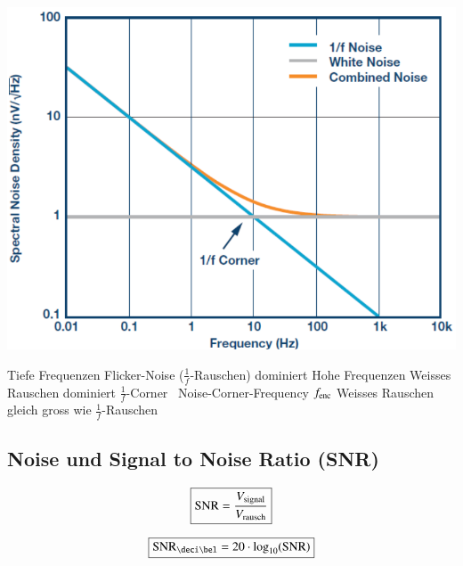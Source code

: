 \begin{minipage}[c]{0.4\columnwidth}
    \includegraphics[width=\columnwidth]{images/rausch-arten_opamps.png}
\end{minipage}
\hfill
\begin{minipage}[c]{0.58\columnwidth}
    \raggedright
    \begin{outline}
        \1 Tiefe Frequenzen
            \2 Flicker-Noise ($\frac{1}{f}$-Rauschen) dominiert
        \1 Hohe Frequenzen
            \2 Weisses Rauschen dominiert
        \1 $\frac{1}{f}$-Corner \textrightarrow\ Noise-Corner-Frequency $f_{\rm enc}$
            \2 Weisses Rauschen gleich gross wie $\frac{1}{f}$-Rauschen
    \end{outline}
\end{minipage}


\subsection{Noise und Signal to Noise Ratio (SNR)}

\begin{minipage}[c]{0.48\columnwidth}
    $$ \boxed{ \text{SNR} = \frac{V_{\rm signal}}{V_{\rm rausch}} } $$
\end{minipage}
\hfill
\begin{minipage}[c]{0.48\columnwidth}
    $$ \boxed{ \text{SNR}_{\deci \bel} = 20 \cdot \log_{10} (\text{SNR})} $$
\end{minipage}



